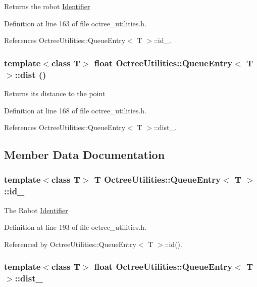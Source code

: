 Returns the robot \hyperlink{class_identifier}{Identifier} 

Definition at line 163 of file octree\_\-utilities.h.

References OctreeUtilities::QueueEntry$<$ T $>$::id\_\-.\hypertarget{class_octree_utilities_1_1_queue_entry_3e71be860b89a0f4fd267c6357379cd8}{
\subsubsection[dist]{\setlength{\rightskip}{0pt plus 5cm}template$<$class T$>$ float {\bf OctreeUtilities::QueueEntry}$<$ T $>$::dist ()}}
\label{class_octree_utilities_1_1_queue_entry_3e71be860b89a0f4fd267c6357379cd8}


Returns its distance to the point 

Definition at line 168 of file octree\_\-utilities.h.

References OctreeUtilities::QueueEntry$<$ T $>$::dist\_\-.

\subsection{Member Data Documentation}
\hypertarget{class_octree_utilities_1_1_queue_entry_e6484d99214e495d595ac287694e9d31}{
\subsubsection[id\_\-]{\setlength{\rightskip}{0pt plus 5cm}template$<$class T$>$ T {\bf OctreeUtilities::QueueEntry}$<$ T $>$::{\bf id\_\-}}}
\label{class_octree_utilities_1_1_queue_entry_e6484d99214e495d595ac287694e9d31}


The Robot \hyperlink{class_identifier}{Identifier} 

Definition at line 193 of file octree\_\-utilities.h.

Referenced by OctreeUtilities::QueueEntry$<$ T $>$::id().\hypertarget{class_octree_utilities_1_1_queue_entry_80e3dbbc0d9529e1068dd13db3501a04}{
\subsubsection[dist\_\-]{\setlength{\rightskip}{0pt plus 5cm}template$<$class T$>$ float {\bf OctreeUtilities::QueueEntry}$<$ T $>$::{\bf dist\_\-}}}
\label{class_octree_utilities_1_1_queue_entry_80e3dbbc0d9529e1068dd13db3501a04}


